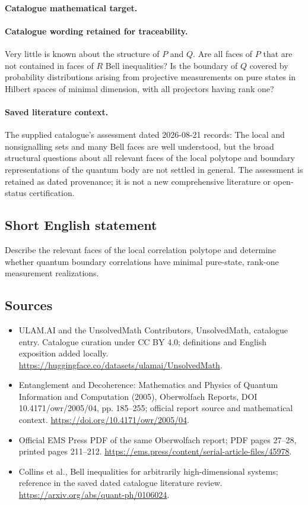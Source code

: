 \documentclass[11pt]{article}
\begin{document}
\paragraph{Catalogue mathematical target.}
\paragraph{Catalogue wording retained for traceability.}
Very little is known about the structure of $P$ and $Q$. Are all faces of $P$ that are not contained in faces of $R$ Bell inequalities? Is the boundary of $Q$ covered by probability distributions arising from projective measurements on pure states in Hilbert spaces of minimal dimension, with all projectors having rank one?

\paragraph{Saved literature context.} The supplied catalogue's assessment dated 2026-08-21 records: The local and nonsignalling sets and many Bell faces are well understood, but the broad structural questions about all relevant faces of the local polytope and boundary representations of the quantum body are not settled in general. The assessment is retained as dated provenance; it is not a new comprehensive literature or open-status certification.
\subsection{Short English statement}
Describe the relevant faces of the local correlation polytope and determine whether quantum boundary correlations have minimal pure-state, rank-one measurement realizations.
\subsection{Sources}
\begin{itemize}
\item[\hypertarget{source:statement:1}{S1}] ULAM.AI and the UnsolvedMath Contributors, UnsolvedMath, catalogue entry. Catalogue curation under CC BY 4.0; definitions and English exposition added locally.
\url{https://huggingface.co/datasets/ulamai/UnsolvedMath}.
\item[\hypertarget{source:statement:2}{S2}] Entanglement and Decoherence: Mathematics and Physics of Quantum Information and Computation (2005), Oberwolfach Reports, DOI 10.4171/owr/2005/04, pp. 185--255; official report source and mathematical context.
\url{https://doi.org/10.4171/owr/2005/04}.
\item[\hypertarget{source:statement:3}{S3}] Official EMS Press PDF of the same Oberwolfach report; PDF pages 27--28, printed pages 211--212.
\url{https://ems.press/content/serial-article-files/45978}.
\item[\hypertarget{source:statement:4}{S4}] Collins et al., Bell inequalities for arbitrarily high-dimensional systems; reference in the saved dated catalogue literature review.
\url{https://arxiv.org/abs/quant-ph/0106024}.
\end{itemize}
\label{end:statement}
\end{document}

